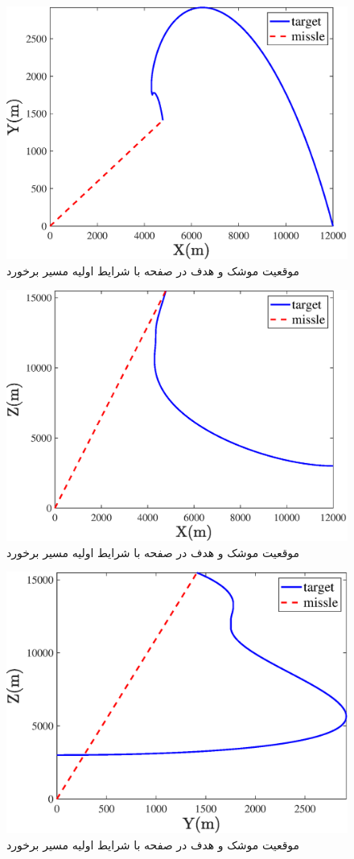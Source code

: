 \begin{figure}[H]
	\centering
	\includegraphics[width=.75\linewidth]{../Figure/Q1/a/xy_sec_I}
	\caption{موقعیت موشک و هدف در صفحه 
		با شرایط اولیه مسیر برخورد}
\end{figure}

\begin{figure}[H]
	\centering
	\includegraphics[width=.75\linewidth]{../Figure/Q1/a/xz_sec_I}
	\caption{موقعیت موشک و هدف در صفحه 
		با شرایط اولیه مسیر برخورد}
\end{figure}

\begin{figure}[H]
	\centering
	\includegraphics[width=.75\linewidth]{../Figure/Q1/a/yz_sec_I}
	\caption{موقعیت موشک و هدف در صفحه 
		با شرایط اولیه مسیر برخورد}
\end{figure}


